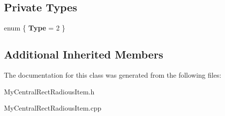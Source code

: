 \subsection*{Private Types}
\begin{DoxyCompactItemize}
\item 
\hypertarget{class_my_central_rect_radious_item_ad3b99c3853596eaea45aff2044a28950}{}enum \{ {\bfseries Type} = 2
 \}\label{class_my_central_rect_radious_item_ad3b99c3853596eaea45aff2044a28950}

\end{DoxyCompactItemize}
\subsection*{Additional Inherited Members}


The documentation for this class was generated from the following files\+:\begin{DoxyCompactItemize}
\item 
My\+Central\+Rect\+Radious\+Item.\+h\item 
My\+Central\+Rect\+Radious\+Item.\+cpp\end{DoxyCompactItemize}
